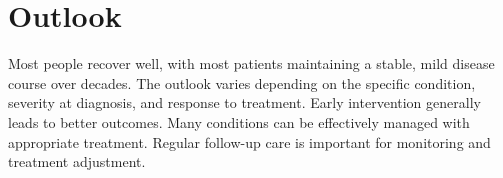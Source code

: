 \section{Outlook}
Most people recover well, with most patients maintaining a stable, mild disease course over decades. The outlook varies depending on the specific condition, severity at diagnosis, and response to treatment. Early intervention generally leads to better outcomes. Many conditions can be effectively managed with appropriate treatment. Regular follow-up care is important for monitoring and treatment adjustment.
